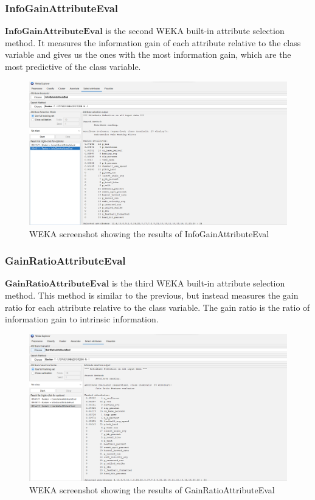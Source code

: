 \documentclass[12pt]{article}
\begin{document}
\subsubsection{InfoGainAttributeEval}
$\textbf{InfoGainAttributeEval}$ is the second WEKA built-in attribute selection method. It measures the information gain of each attribute relative to the class variable and gives us the ones with the most information gain, which are the most predictive of the class variable. 
\begin{figure}[h!]
    \includegraphics[scale=0.4]{./images/InfoGainAttributeEval/InfoGainAttributeEval.png}
    \centering
    \caption{WEKA screenshot showing the results of InfoGainAttributeEval}
    \label{fig:InfoGain}
\end{figure}

\newpage
\subsubsection{GainRatioAttributeEval}
$\textbf{GainRatioAttributeEval}$ is the third WEKA built-in attribute selection method. This method is similar to the previous, but instead measures the gain ratio for each attribute relative to the class variable. The gain ratio is the ratio of information gain to intrinsic information. 
\begin{figure}[h!]
    \includegraphics[scale=0.45]{./images/GainRatioAttributeEval/GainRatioAttributeEval.png}
    \centering
    \caption{WEKA screenshot showing the results of GainRatioAttributeEval}
    \label{fig:GainRatio}
\end{figure}
\end{document}
